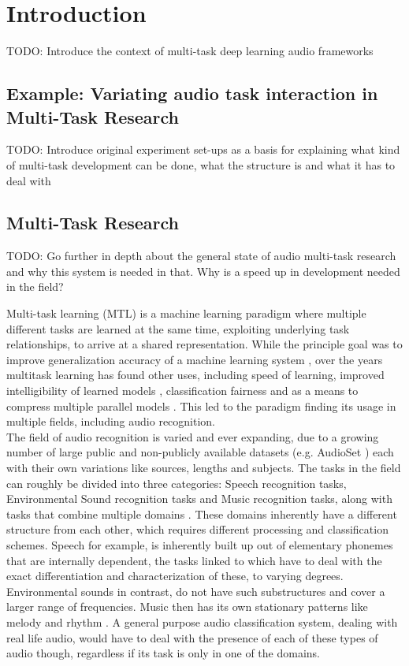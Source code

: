 \chapter{Introduction}
TODO: Introduce the context of multi-task deep learning audio frameworks


\section{Example: Variating audio task interaction in Multi-Task Research}
TODO: Introduce original experiment set-ups as a basis for explaining what kind of multi-task development can be done, what the structure is and what it has to deal with

\section{Multi-Task Research}
TODO: Go further in depth about the general state of audio multi-task research and why this system is needed in that. Why is a speed up in development needed in the field?

Multi-task learning (MTL) is a machine learning paradigm where multiple different tasks are learned at the same time, exploiting underlying task relationships, to arrive at a shared representation. While the principle goal was to improve generalization accuracy of a machine learning system \citep{caruana1997multitask}, over the years multitask learning has found other uses, including speed of learning, improved intelligibility of learned models \citep{caruana1997multitask}, classification fairness \citep{oneto2019taking} and as a means to compress multiple parallel models \citep{georgiev2017heterogeneous}. This led to the paradigm finding its usage in multiple fields, including audio recognition.\\

The field of audio recognition is varied and ever expanding, due to a growing number of large public and non-publicly available datasets (e.g. AudioSet \citep{gemmeke2017audio}) each with their own variations like sources, lengths and subjects. The tasks in the field can roughly be divided into three categories: Speech recognition tasks, Environmental Sound recognition tasks and Music recognition tasks, along with tasks that combine multiple domains \citep{duan2014survey}. These domains inherently have a different structure from each other, which requires different processing and classification schemes. Speech for example, is inherently built up out of elementary phonemes that are internally dependent, the tasks linked to which have to deal with the exact differentiation and characterization of these, to varying degrees. Environmental sounds in contrast, do not have such substructures and cover a larger range of frequencies. Music then has its own stationary patterns like melody and rhythm \citep{boregowda2018environmental}. A general purpose audio classification system, dealing with real life audio, would have to deal with the presence of each of these types of audio though, regardless if its task is only in one of the domains.\\    

